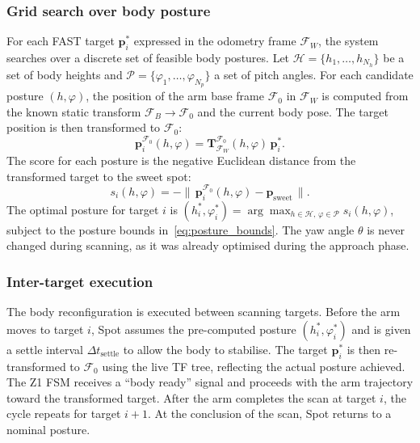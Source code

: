 \subsubsection{Grid search over body posture}
For each FAST target $\mathbf{p}_i^*$ expressed in the odometry frame
$\mathcal{F}_W$, the system searches over a discrete set of feasible body
postures. Let $\mathcal{H} = \{h_1, \ldots, h_{N_h}\}$ be a set of body
heights and $\mathcal{P} = \{\varphi_1, \ldots, \varphi_{N_p}\}$ a set of
pitch angles. For each candidate posture $(h, \varphi)$, the position of
the arm base frame $\mathcal{F}_0$ in $\mathcal{F}_W$ is computed from the
known static transform $\mathcal{F}_B \to \mathcal{F}_0$ and the current
body pose. The target position is then transformed to $\mathcal{F}_0$:
\begin{equation}
  \mathbf{p}_i^{\mathcal{F}_0}(h, \varphi) =
  \mathbf{T}_{\mathcal{F}_W}^{\mathcal{F}_0}(h, \varphi)\,
  \mathbf{p}_i^*.
  \label{eq:target_in_F0}
\end{equation}
The score for each posture is the negative Euclidean distance from the
transformed target to the sweet spot:
\begin{equation}
  s_i(h, \varphi) =
  -\bigl\|\,\mathbf{p}_i^{\mathcal{F}_0}(h, \varphi) -
  \mathbf{p}_{\mathrm{sweet}}\,\bigr\|.
  \label{eq:posture_score}
\end{equation}
The optimal posture for target $i$ is
$(h_i^*, \varphi_i^*) = \arg\max_{h \in \mathcal{H},\, \varphi \in \mathcal{P}}
s_i(h, \varphi)$, subject to the posture bounds
in~\eqref{eq:posture_bounds}. The yaw angle $\theta$ is never changed
during scanning, as it was already optimised during the approach phase.

\subsubsection{Inter-target execution}
The body reconfiguration is executed between scanning targets. Before the
arm moves to target $i$, Spot assumes the pre-computed posture
$(h_i^*, \varphi_i^*)$ and is given a settle interval
$\Delta t_{\mathrm{settle}}$ to allow the body to stabilise. The target
$\mathbf{p}_i^*$ is then re-transformed to $\mathcal{F}_0$ using the live
\ac{TF} tree, reflecting the actual posture achieved. The Z1 \ac{FSM}
receives a ``body ready'' signal and proceeds with the arm trajectory
toward the transformed target. After the arm completes the scan at target
$i$, the cycle repeats for target $i+1$. At the conclusion of the scan,
Spot returns to a nominal posture.

